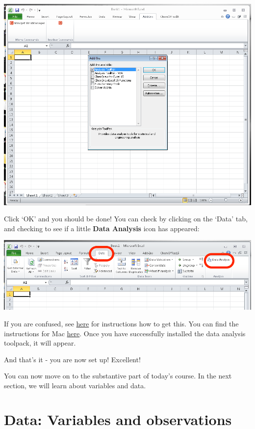 \documentclass[
]{book}
\begin{document}
\includegraphics{imgs/install_toolpak_after_go_popup.png}

Click `OK' and you should be done! You can check by clicking on the `Data' tab, and checking to see if a little \textbf{Data Analysis} icon has appeared:

\includegraphics{imgs/data_tab_analysis_appears.png}

If you are confused, see \href{https://support.office.com/en-gb/article/Load-the-Analysis-ToolPak-6a63e598-cd6d-42e3-9317-6b40ba1a66b4}{here} for instructions how to get this. You can find the instructions for Mac \href{https://support.microsoft.com/en-us/office/load-the-analysis-toolpak-in-excel-6a63e598-cd6d-42e3-9317-6b40ba1a66b4\#OfficeVersion=macOS}{here}. Once you have successfully installed the data analysis toolpack, it will appear.

And that's it - you are now set up! Excellent!

You can now move on to the substantive part of today's course. In the next section, we will learn about variables and data.

\hypertarget{data-variables-and-observations}{%
\section{Data: Variables and observations}\label{data-variables-and-observations}}
\end{document}
